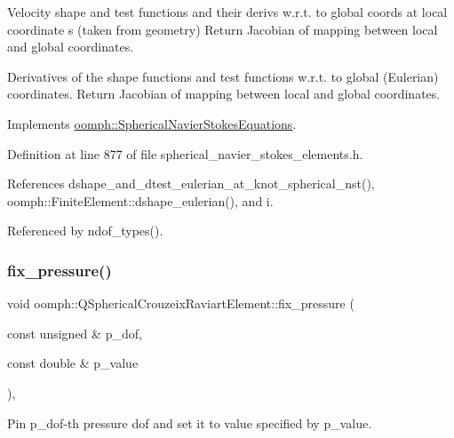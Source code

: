 Velocity shape and test functions and their derivs w.\+r.\+t. to global coords at local coordinate s (taken from geometry) Return Jacobian of mapping between local and global coordinates. 

Derivatives of the shape functions and test functions w.\+r.\+t. to global (Eulerian) coordinates. Return Jacobian of mapping between local and global coordinates. 

Implements \hyperlink{classoomph_1_1SphericalNavierStokesEquations_a3b9e9cf2d59dffcf278b4c9f73be6d62}{oomph\+::\+Spherical\+Navier\+Stokes\+Equations}.



Definition at line 877 of file spherical\+\_\+navier\+\_\+stokes\+\_\+elements.\+h.



References dshape\+\_\+and\+\_\+dtest\+\_\+eulerian\+\_\+at\+\_\+knot\+\_\+spherical\+\_\+nst(), oomph\+::\+Finite\+Element\+::dshape\+\_\+eulerian(), and i.



Referenced by ndof\+\_\+types().

\mbox{\label{classoomph_1_1QSphericalCrouzeixRaviartElement_a61feca031056f09a70e1d9901d20b58b}} 
\subsubsection{\texorpdfstring{fix\+\_\+pressure()}{fix\_pressure()}}
{\footnotesize\ttfamily void oomph\+::\+Q\+Spherical\+Crouzeix\+Raviart\+Element\+::fix\+\_\+pressure (\begin{DoxyParamCaption}\item[{const unsigned \&}]{p\+\_\+dof,  }\item[{const double \&}]{p\+\_\+value }\end{DoxyParamCaption})\hspace{0.3cm}{\ttfamily [inline]}, {\ttfamily [virtual]}}



Pin p\+\_\+dof-\/th pressure dof and set it to value specified by p\+\_\+value. 



